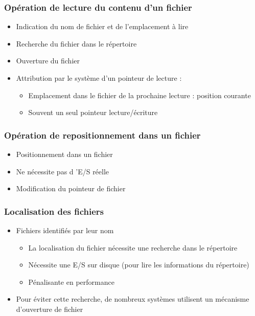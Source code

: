 \begin{frame}
\frametitle{Opération de lecture du contenu d'un fichier}
\begin{itemize}
\item Indication du nom de fichier et de l'emplacement à lire
\item Recherche du fichier dans le répertoire
\item Ouverture du fichier 
\item Attribution par le système d'un pointeur de lecture :
\begin{itemize}
\item Emplacement dans le fichier de la prochaine lecture : position courante
\item Souvent un seul pointeur lecture/écriture
\end{itemize}
\end{itemize}
\end{frame}

\begin{frame}
\frametitle{Opération de repositionnement dans un fichier}
\begin{itemize}
\item Positionnement dans un fichier
\item Ne nécessite pas d 'E/S réelle
\item Modification du pointeur de fichier
\end{itemize}
\end{frame}

\begin{frame}
\frametitle{Localisation des fichiers}
\begin{itemize}
\item Fichiers identifiés par leur nom
\begin{itemize}
\item La localisation du fichier nécessite une recherche dans le répertoire
\item Nécessite une E/S sur disque (pour lire les informations du répertoire)
\item Pénalisante en performance
\end{itemize}
\item Pour éviter cette recherche, de nombreux systèmes utilisent un mécanisme d'ouverture de fichier
\end{itemize}
\end{frame}

